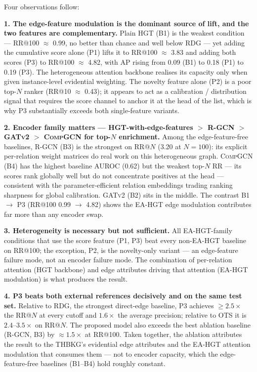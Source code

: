 \documentclass[a4,center]{NAR}
\newcommand{\hgt}{\textsc{HGT}}
\newcommand{\gatv}{\textsc{GATv2}}
\newcommand{\rgcn}{\textsc{R-GCN}}
\newcommand{\compgcn}{\textsc{CompGCN}}
\newcommand{\eahgt}{\textsc{EA-HGT}}
\begin{document}
{Four observations follow:

\textbf{1. The edge-feature modulation is the dominant source of lift,
and the two features are complementary.} Plain \hgt{} (B1) is the
weakest condition --- RR@100 $\approx$ 0.99, no better than chance and
well below RDG --- yet adding the cumulative score alone (P1) lifts it
to RR@100 $\approx$ 3.83 and adding both scores (P3) to RR@100 $\approx$
4.82, with AP rising from 0.09 (B1) to 0.18 (P1) to 0.19 (P3). The
heterogeneous attention backbone realises its capacity only when given
instance-level evidential weighting. The novelty feature alone (P2) is a
poor top-$N$ ranker (RR@10 $\approx$ 0.43); it appears to act as a
calibration / distribution signal that requires the score channel to
anchor it at the head of the list, which is why P3 substantially
exceeds both single-feature variants.

\textbf{2. Encoder family matters --- \hgt{}-with-edge-features
$>$ \rgcn{} $>$ \gatv{} $>$ \compgcn{} for top-$N$ enrichment.}
Among the edge-feature-free baselines, \rgcn{} (B3) is the strongest on
RR@$N$ (3.20 at $N = 100$): its explicit per-relation weight matrices do
real work on this heterogeneous graph. \compgcn{} (B4) has the highest
baseline AUROC (0.62) but the weakest top-$N$ RR --- its scores rank
globally well but do not concentrate positives at the head ---
consistent with the parameter-efficient relation embeddings trading
ranking sharpness for global calibration. \gatv{} (B2) sits in the
middle. The contrast B1 $\to$ P3 (RR@100 0.99 $\to$ 4.82) shows the
\eahgt{} edge modulation contributes far more than any encoder swap.

\textbf{3. Heterogeneity is necessary but not sufficient.} All
\eahgt{}-family conditions that use the score feature (P1, P3) beat
every non-\eahgt{} baseline on RR@100; the exception, P2, is the
novelty-only variant --- an edge-feature failure mode, not an encoder
failure mode. The combination of per-relation attention (\hgt{}
backbone) and edge attributes driving that attention (\eahgt{}
modulation) is what produces the result.

\textbf{4. P3 beats both external references decisively and on the same
test set.} Relative to RDG, the strongest direct-edge baseline, P3
achieves $\geq 2.5\times$ the RR@$N$ at every cutoff and $1.6\times$ the
average precision; relative to OTS it is $2.4$--$3.5\times$ on RR@$N$.
The proposed model also exceeds the best ablation baseline (\rgcn{},
B3) by $\approx 1.5\times$ at RR@100. Taken together, the ablation
attributes the result to the THBKG's evidential edge attributes and the
\eahgt{} attention modulation that consumes them --- not to encoder
capacity, which the edge-feature-free baselines (B1--B4) hold roughly
constant.


}
\end{document}
